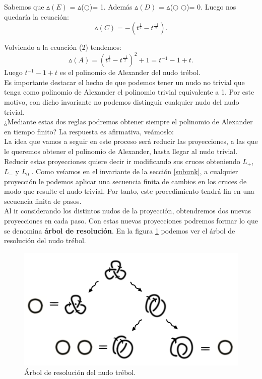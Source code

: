 Sabemos que $\vartriangle(E)$ = $\vartriangle$($\bigcirc$)= 1. Además $\vartriangle(D)$ = $\vartriangle$($\bigcirc$ $\bigcirc$)= 0. Luego nos quedaría la ecuación:
\begin{equation}
\vartriangle(C) = -  (t^{\frac{1}{2}} - t^{\frac{-1}{2}}).
\end{equation}

Volviendo a la ecuación (2) tendemos:
\begin{equation}
\vartriangle(A) =  (t^{\frac{1}{2}} - t^{\frac{-1}{2}})^{2} + 1 = t^{-1} -1 + t.
\end{equation}
Luego $ t^{-1} -1 + t $ es el polinomio de Alexander del nudo trébol. \\

\bigskip
Es importante destacar el hecho de que podemos tener un nudo no trivial que tenga como polinomio de Alexander el polinomio trivial equivalente a 1. Por este motivo, con dicho invariante no podemos distinguir cualquier nudo del nudo trivial. \\

¿Mediante estas dos reglas podremos obtener siempre el polinomio de Alexander en tiempo finito? La respuesta es afirmativa, veámoslo:\\

La idea que vamos a seguir en este proceso será reducir las proyecciones, a las que le queremos obtener el polinomio de Alexander, hasta llegar al nudo trivial. Reducir estas proyecciones quiere decir ir modificando sus cruces obteniendo $L_{+}$, $L_{-}$ y $L_{0}$ . Como veíamos en el invariante de la sección \ref{subunk}, a cualquier proyección le podemos aplicar una secuencia finita de cambios en los cruces de modo que resulte el nudo trivial. Por tanto, este procedimiento tendrá fin en una secuencia finita de pasos.\\

Al ir considerando los distintos nudos de la proyección, obtendremos dos nuevas proyecciones en cada paso. Con estas nuevas proyecciones podremos formar lo que se denomina \textbf{ árbol de resolución}. En la figura \ref{alex4} podemos ver el árbol de resolución del nudo trébol.\\

\begin{figure}[h!]
	\centering
	\includegraphics[width=18cm]{inudos/arbol.png}
	\caption{Árbol de resolución del nudo trébol.}
	\label{alex4} 
\end{figure}


